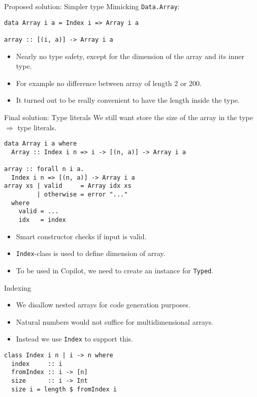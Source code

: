 \documentclass{beamer}
\begin{document}
\begin{frame}[fragile]{Proposed solution: Simpler type}
Mimicking \texttt{Data.Array}:
\begin{lstlisting}
data Array i a = Index i => Array i a

array :: [(i, a)] -> Array i a
\end{lstlisting}
\begin{itemize}
  \item Nearly no type safety, except for the dimension of the array and its
  inner type.
  \item For example no difference between array of length 2 or 200.
  \item It turned out to be really convenient to have the length inside the
  type.
\end{itemize}
\end{frame}



\begin{frame}[fragile]{Final solution: Type literals}
We still want store the size of the array in the type $\Rightarrow$ type
literals.
\begin{lstlisting}[basicstyle=\small]
data Array i a where
  Array :: Index i n => i -> [(n, a)] -> Array i a

array :: forall n i a.
  Index i n => [(n, a)] -> Array i a
array xs | valid     = Array idx xs
         | otherwise = error "..."
  where
    valid = ...
    idx   = index
\end{lstlisting}
\begin{itemize}
  \item Smart constructor checks if input is valid.
  \item \texttt{Index}-class is used to define dimension of array.
  \item To be used in Copilot, we need to create an instance for \texttt{Typed}.
\end{itemize}
\end{frame}


\begin{frame}[fragile]{Indexing}
\begin{itemize}
  \item We disallow nested arrays for code generation purposes.
  \item Natural numbers would not suffice for multidimensional arrays.
  \item Instead we use \texttt{Index} to support this.
\end{itemize}
\begin{lstlisting}[basicstyle=\small]
class Index i n | i -> n where
  index     :: i
  fromIndex :: i -> [n]
  size      :: i -> Int
  size i = length $ fromIndex i
\end{lstlisting}
\end{frame}
\end{document}
